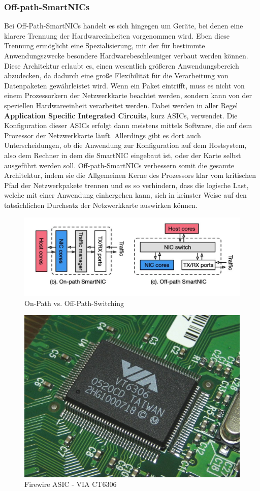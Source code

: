 \subsubsection{Off-path-SmartNICs}
Bei Off-Path-SmartNICs handelt es sich hingegen um Geräte, bei denen eine klarere Trennung der Hardwareeinheiten vorgenommen wird. Eben diese Trennung ermöglicht eine Spezialisierung, mit der für bestimmte Anwendungszwecke besondere Hardwarebeschleuniger verbaut werden können. Diese Architektur erlaubt es, einen wesentlich größeren Anwendungsbereich abzudecken, da dadurch eine große Flexibilität für die Verarbeitung von Datenpaketen gewährleistet wird. Wenn ein Paket eintrifft, muss es nicht von einem Prozessorkern der Netzwerkkarte beachtet werden, sondern kann von der speziellen Hardwareeinheit verarbeitet werden. \cite{onoffpath} Dabei werden in aller Regel \textbf{Application Specific Integrated Circuits}, kurz ASICs, verwendet. Die Konfiguration dieser ASICs erfolgt dann meistens mittels Software, die auf dem Prozessor der Netzwerkkarte läuft. Allerdings gibt es dort auch Unterscheidungen, ob die Anwendung zur Konfiguration auf dem Hostsystem, also dem Rechner in dem die SmartNIC eingebaut ist, oder der Karte selbst ausgeführt werden soll. Off-path-SmartNICs verbessern somit die gesamte Architektur, indem sie die Allgemeinen Kerne des Prozessors klar vom kritischen Pfad der Netzwerkpakete trennen und es so verhindern, dass die logische Last, welche mit einer Anwendung einhergehen kann, sich in keinster Weise auf den tatsächlichen Durchsatz der Netzwerkkarte auswirken können.
\begin{figure}
    \centering
    \includegraphics[width=0.9\linewidth]{images/Screenshot 2025-03-16 at 10-41-14 Netdev 0x14 -- Taking Control of your SmartNIC v1.pdf.png}
    \caption{On-Path vs. Off-Path-Switching \cite{onoffpathpic}}
    \label{fig:enter-label}
\end{figure}
\begin{figure}
    \centering
    \includegraphics[width=0.5\linewidth]{images/Buffalo_IFC-ILP4_VIA_VT6306.jpg}
    \caption{Firewire ASIC - VIA CT6306 \cite{firewireasic}}
    \label{fig:enter-label}
\end{figure}
